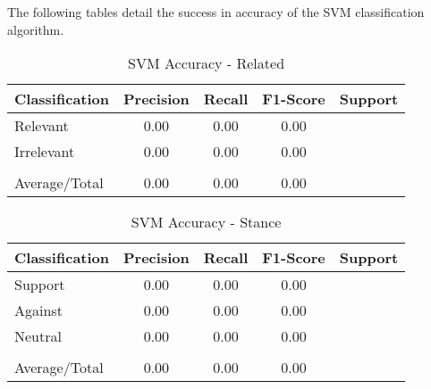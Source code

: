 The following tables detail the success in accuracy of the SVM classification algorithm.

\begin{table}[H]
    \centering
    \caption{SVM Accuracy - Related}
    \begin{tabular}{m{4.5cm} m{1.5cm} m{1.1cm} m{1.6cm} m{1.5cm}}
        \toprule
        \rowcolor{White}\textbf{Classification} & {\textbf{Precision}} & {\textbf{Recall}} & {\textbf{F1-Score}} & {\textbf{Support}} \\
                \midrule
        Relevant & \multicolumn{1}{c}{0.00} & \multicolumn{1}{c}{0.00} & \multicolumn{1}{c}{0.00} & \multicolumn{1}{c}{ }\\
        Irrelevant & \multicolumn{1}{c}{0.00} & \multicolumn{1}{c}{0.00} & \multicolumn{1}{c}{0.00} & \multicolumn{1}{c}{ }\\
         & \multicolumn{1}{c}{} & \multicolumn{1}{c}{} & \multicolumn{1}{c}{} & \multicolumn{1}{c}{}\\
        \rowcolor{White}Average/Total & \multicolumn{1}{c}{0.00} & \multicolumn{1}{c}{0.00} & \multicolumn{1}{c}{0.00} & \multicolumn{1}{c}{ }\\

        \bottomrule
    \end{tabular}
\end{table}

\begin{table}[H]
    \centering
    \caption{SVM Accuracy - Stance}
    \begin{tabular}{m{4.5cm} m{1.5cm} m{1.1cm} m{1.6cm} m{1.5cm}}
        \toprule
        \rowcolor{White}\textbf{Classification} & {\textbf{Precision}} & {\textbf{Recall}} & {\textbf{F1-Score}} & {\textbf{Support}} \\
                \midrule
        Support & \multicolumn{1}{c}{0.00} & \multicolumn{1}{c}{0.00} & \multicolumn{1}{c}{0.00} & \multicolumn{1}{c}{ }\\
        Against & \multicolumn{1}{c}{0.00} & \multicolumn{1}{c}{0.00} & \multicolumn{1}{c}{0.00} & \multicolumn{1}{c}{ }\\
        Neutral & \multicolumn{1}{c}{0.00} & \multicolumn{1}{c}{0.00} & \multicolumn{1}{c}{0.00} & \multicolumn{1}{c}{ }\\
         & \multicolumn{1}{c}{} & \multicolumn{1}{c}{} & \multicolumn{1}{c}{} & \multicolumn{1}{c}{}\\
        \rowcolor{White}Average/Total & \multicolumn{1}{c}{0.00} & \multicolumn{1}{c}{0.00} & \multicolumn{1}{c}{0.00} & \multicolumn{1}{c}{ }\\

        \bottomrule
    \end{tabular}
\end{table}

